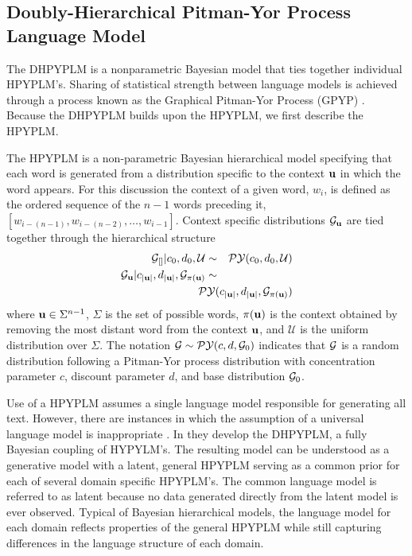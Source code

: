 \subsection{Doubly-Hierarchical Pitman-Yor Process Language Model}

The DHPYPLM is a nonparametric Bayesian model that ties together individual HPYPLM's. Sharing of statistical strength between language models is achieved through a process known as the Graphical Pitman-Yor Process (GPYP) \cite{Wood2009a}.  Because the DHPYPLM builds upon the HPYPLM, we first describe the HPYPLM.

The HPYPLM is a non-parametric Bayesian hierarchical model specifying that each word is generated from a distribution specific to the context ${\bf u}$ in which the word appears.  For this discussion the context of a given word, $w_i$, is  defined as the ordered sequence of the $n-1$ words preceding it, $[w_{i - (n-1)}, w_{i-(n-2)}, \ldots, w_{i-1}]$.  Context specific distributions $\G_{\bu}$ are tied together through the hierarchical structure
%
\begin{eqnarray}
\G_{[]}| c_0, d_0, \mathcal{U} &\sim& \PY(c_0, d_0, \mathcal{U}) \nonumber \\
\G_\bu | c_{|\bu|}, d_{|\bu|}, \G_{\pi (\bu)} &\sim&  \nonumber \\
& & \hspace{-1cm} \PY( c_{|\bu|}, d_{|\bu|},  \G_{\pi (\bu)})  \label{eqn:hpyplm}
\end{eqnarray}
%
\noindent where $\bu \in \Sigma^{n-1}$, $\Sigma$ is the set of possible words, $\pi(\bu)$ is the context obtained by removing the most distant word from the context $\bu$, and $\mathcal{U}$ is the uniform distribution over $\Sigma$.  The notation $\G \sim \PY(c,d,\G_0)$ indicates that $\G$ is a random distribution following a Pitman-Yor process distribution with concentration parameter $c$, discount parameter $d$, and base distribution $\G_0$.

Use of a HPYPLM assumes a single language model responsible for generating all text.  However, there are instances in which the assumption of a universal language model is inappropriate \cite{Rosenfeld2000}.  In \cite{Wood2009a} they develop the DHPYPLM, a fully Bayesian coupling of HYPYLM's. The resulting model can be understood as a generative model with a latent, general HPYPLM serving as a common prior for each of several domain specific HPYPLM's.  The common language model is referred to as latent because no data generated directly from the latent model is ever observed.  Typical of Bayesian hierarchical models, the language model for each domain reflects properties of the general HPYPLM while still capturing differences in the language structure of each domain.  

